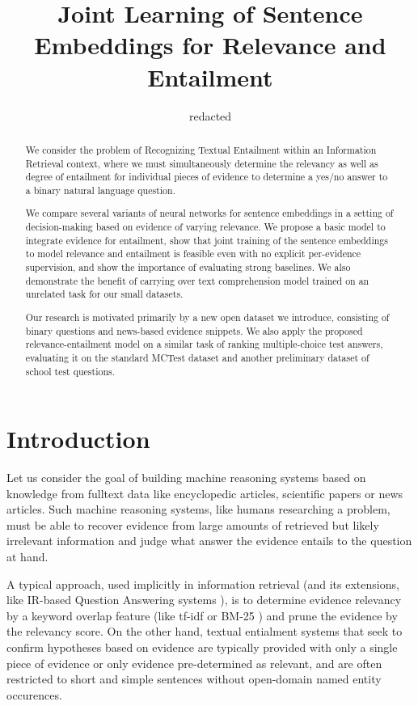 \documentclass[11pt]{article}
\title{Joint Learning of Sentence Embeddings for Relevance and Entailment}
\author{redacted}
\date{}
\begin{document}
\maketitle

\begin{abstract}
	We consider the problem of Recognizing Textual Entailment
	within an Information Retrieval context, where we must simultaneously
	determine the relevancy as well as degree of entailment for individual
	pieces of evidence to determine a yes/no answer to a binary
	natural language question.

	We compare several variants of neural networks for sentence embeddings
	in a setting of decision-making based on evidence of varying relevance.
	We propose a basic model to integrate evidence for entailment,
	show that joint training of the sentence embeddings to model
	relevance and entailment is feasible even with no explicit per-evidence
	supervision, and show the importance of evaluating strong baselines.
	We also demonstrate the benefit of carrying over text comprehension model
	trained on an unrelated task for our small datasets.

	Our research is motivated primarily by a new open dataset we introduce,
	consisting of binary questions and news-based evidence snippets.
	We also apply the proposed relevance-entailment model on a similar task
	of ranking multiple-choice test answers, evaluating it on the standard
	MCTest dataset and another preliminary dataset of school test questions.
\end{abstract}

\section{Introduction}

Let us consider the goal of building machine reasoning systems based
on knowledge from fulltext data like encyclopedic articles, scientific
papers or news articles.
Such machine reasoning systems, like humans researching a problem,
must be able to recover evidence from large amounts of retrieved
but likely irrelevant information and judge what answer the evidence entails
to the question at hand.

A typical approach, used implicitly in information retrieval
(and its extensions, like IR-based Question Answering systems \cite{YodaQAPoster2015}),
is to determine evidence relevancy by a keyword overlap feature (like tf-idf or BM-25 \cite{BM25})
and prune the evidence by the relevancy score.
On the other hand, textual entialment systems that seek to confirm hypotheses
based on evidence \cite{RTE1} \cite{SICK2014} \cite{SNLI}
are typically provided with only a single piece of evidence
or only evidence pre-determined as relevant, and are often restricted
to short and simple sentences without open-domain named entity occurences.
\end{document}

